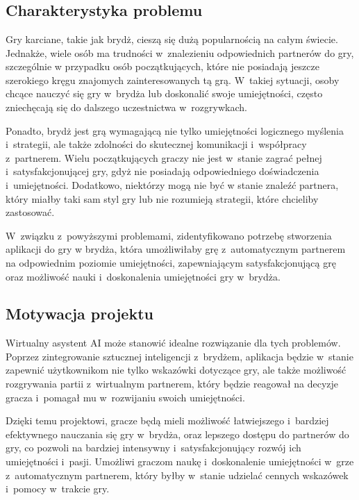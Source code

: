 \chapter{\ChapterTitleProjectVision}
\label{sec:cel-wizja}


\section{Charakterystyka problemu}

Gry karciane, takie jak brydż, cieszą się dużą popularnością na całym świecie.
Jednakże, wiele osób ma trudności w~znalezieniu odpowiednich partnerów do gry,
szczególnie w przypadku osób początkujących, które nie posiadają jeszcze
szerokiego kręgu znajomych zainteresowanych tą grą. W~takiej sytuacji, osoby
chcące nauczyć się gry w~brydża lub doskonalić swoje umiejętności, często
zniechęcają się do dalszego uczestnictwa w~rozgrywkach.

Ponadto, brydż jest grą wymagającą nie tylko umiejętności logicznego myślenia
i~strategii, ale także zdolności do skutecznej komunikacji i~współpracy
z~partnerem. Wielu początkujących graczy nie jest w~stanie zagrać pełnej
i~satysfakcjonującej gry, gdyż nie posiadają odpowiedniego doświadczenia
i~umiejętności. Dodatkowo, niektórzy mogą nie być w stanie znaleźć
partnera, który miałby taki sam styl gry lub nie rozumieją strategii,
które chcieliby zastosować.

W~związku z~powyższymi problemami, zidentyfikowano potrzebę stworzenia
aplikacji do gry w brydża, która umożliwiłaby grę z~automatycznym
partnerem na odpowiednim poziomie umiejętności, zapewniającym satysfakcjonującą
grę oraz możliwość nauki i~doskonalenia umiejętności gry w~brydża.


\section{Motywacja projektu}

Wirtualny asystent AI może stanowić idealne rozwiązanie dla tych problemów. Poprzez
zintegrowanie sztucznej inteligencji z~brydżem, aplikacja będzie w~stanie
zapewnić użytkownikom nie tylko wskazówki dotyczące gry, ale także możliwość
rozgrywania partii z~wirtualnym partnerem, który będzie reagował na decyzje
gracza i~pomagał mu w~rozwijaniu swoich umiejętności.

Dzięki temu projektowi, gracze będą mieli możliwość łatwiejszego i~bardziej
efektywnego nauczania się gry w~brydża, oraz lepszego dostępu do partnerów
do gry, co pozwoli na bardziej intensywny i~satysfakcjonujący rozwój ich
umiejętności i~pasji. Umożliwi graczom naukę i~doskonalenie umiejętności
w~grze z~automatycznym partnerem, który byłby w~stanie udzielać cennych
wskazówek i~pomocy w~trakcie gry.
\newline

